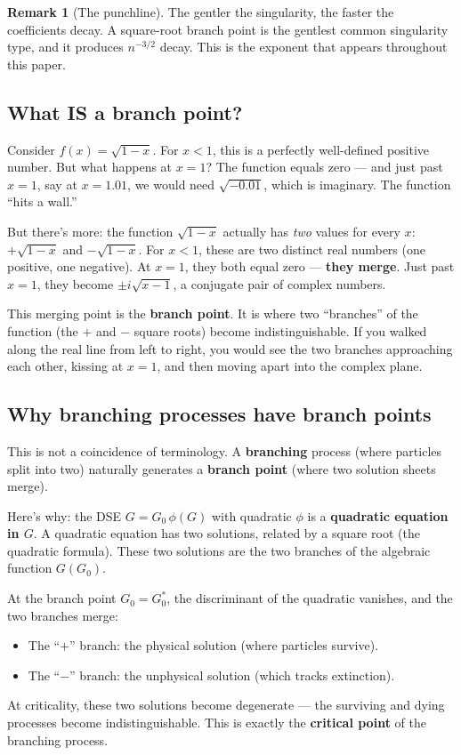 \documentclass[11pt,a4paper]{article}
\theoremstyle{definition}
\newtheorem*{remark}{Remark}
\begin{document}
\begin{remark}[The punchline]
The gentler the singularity, the faster the coefficients decay. A
square-root branch point is the gentlest common singularity type, and
it produces $n^{-3/2}$ decay. This is the exponent that appears throughout
this paper.
\end{remark}

\subsection{What IS a branch point?}

Consider $f(x) = \sqrt{1 - x}$. For $x < 1$, this is a perfectly well-defined
positive number. But what happens at $x = 1$? The function equals zero ---
and just past $x = 1$, say at $x = 1.01$, we would need $\sqrt{-0.01}$,
which is imaginary. The function ``hits a wall.''

But there's more: the function $\sqrt{1-x}$ actually has \emph{two} values
for every $x$: $+\sqrt{1-x}$ and $-\sqrt{1-x}$. For $x < 1$, these are two
distinct real numbers (one positive, one negative). At $x = 1$, they both
equal zero --- \textbf{they merge}. Just past $x = 1$, they become
$\pm i\sqrt{x-1}$, a conjugate pair of complex numbers.

This merging point is the \textbf{branch point}. It is where two
``branches'' of the function (the $+$ and $-$ square roots) become
indistinguishable. If you walked along the real line from left to right,
you would see the two branches approaching each other, kissing at $x = 1$,
and then moving apart into the complex plane.

\subsection{Why branching processes have branch points}

This is not a coincidence of terminology. A \textbf{branching} process
(where particles split into two) naturally generates a \textbf{branch
point} (where two solution sheets merge).

Here's why: the DSE $G = G_0\,\phi(G)$ with quadratic $\phi$ is a
\textbf{quadratic equation in $G$}. A quadratic equation has two
solutions, related by a square root (the quadratic formula). These two
solutions are the two branches of the algebraic function $G(G_0)$.

At the branch point $G_0 = G_0^*$, the discriminant of the quadratic
vanishes, and the two branches merge:
\begin{itemize}
\item The ``$+$'' branch: the physical solution (where particles survive).
\item The ``$-$'' branch: the unphysical solution (which tracks extinction).
\end{itemize}
At criticality, these two solutions become degenerate --- the surviving
and dying processes become indistinguishable. This is exactly the
\textbf{critical point} of the branching process.
\end{document}
